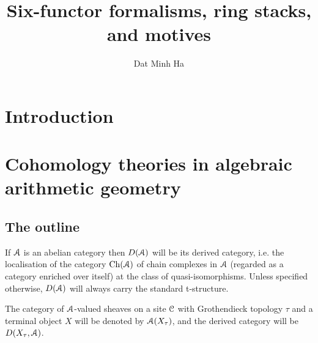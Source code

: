 

\setcounter{section}{-1}





    \title{Six-functor formalisms, ring stacks, and motives}
    
    \author{Dat Minh Ha}
    \maketitle
    
    \begin{abstract}
        
    \end{abstract}
    
    {
      \hypersetup{} 
      \tableofcontents %
    }

    \section{Introduction}

    \section{Cohomology theories in algebraic arithmetic geometry}
        \subsection{The outline}
            \begin{convention}
                If $\mathcal{A}$ is an abelian category then $D(\mathcal{A})$ will be its derived category, i.e. the localisation of the category $\mathrm{Ch}(\mathcal{A})$ of chain complexes in $\mathcal{A}$ (regarded as a category enriched over itself) at the class of quasi-isomorphisms. Unless specified otherwise, $D(\mathcal{A})$ will always carry the standard t-structure.
    
                The category of $\mathcal{A}$-valued sheaves on a site $\mathcal{C}$ with Grothendieck topology $\tau$ and a terminal object $X$ will be denoted by $\mathcal{A}(X_{\tau})$, and the derived category will be $D(X_{\tau}, \mathcal{A})$.

            \end{convention}
    
